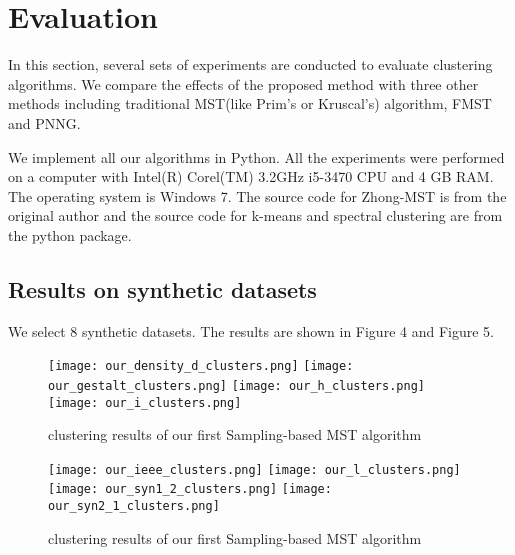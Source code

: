 \section{Evaluation}
	In this section, several sets of experiments are conducted to evaluate clustering algorithms. We compare the effects of the proposed method with three other methods including traditional MST(like Prim's or Kruscal's) algorithm, FMST\cite{zhong2015} and PNNG\cite{Jothi2018}. 

	We implement all our algorithms in Python. All the experiments were performed on a computer with Intel(R) Corel(TM) 3.2GHz i5-3470 CPU and 4 GB RAM. The operating system is Windows 7. The source code for Zhong-MST is from the original author and the source code for k-means and spectral clustering are from the python package.
	\subsection{Results on synthetic datasets}
		We select 8 synthetic datasets. The results are shown in Figure 4 and Figure 5.
	
		\begin{figure}[!t]
	        \centering
	        \texttt{[image: our\_density\_d\_clusters.png]}
	        \texttt{[image: our\_gestalt\_clusters.png]}
	        \texttt{[image: our\_h\_clusters.png]}
	        \texttt{[image: our\_i\_clusters.png]}
	        \caption{clustering results of our first Sampling-based MST algorithm}
	    \end{figure}

	    \begin{figure}[!t]
	        \centering
	        \texttt{[image: our\_ieee\_clusters.png]}
	        \texttt{[image: our\_l\_clusters.png]}
	        \texttt{[image: our\_syn1\_2\_clusters.png]}
	        \texttt{[image: our\_syn2\_1\_clusters.png]}
	        \caption{clustering results of our first Sampling-based MST algorithm}
	    \end{figure}

